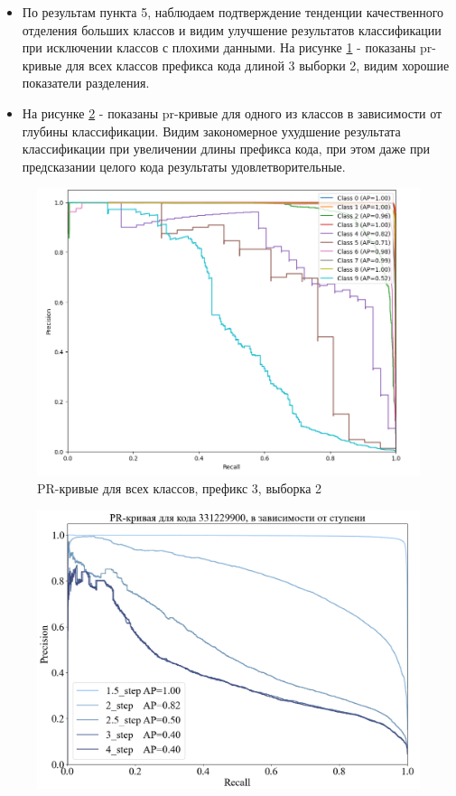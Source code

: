 \documentclass{article}
\begin{document}
\begin{itemize}
    \item По результам пункта 5, наблюдаем подтверждение тенденции качественного отделения больших классов и видим улучшение результатов классификации при исключении классов с плохими данными. На рисунке \ref{fig:pr2} - показаны pr-кривые для всех классов префикса кода длиной 3 выборки 2, видим хорошие показатели разделения. 
    \item На рисунке \ref{fig:pr3} - показаны pr-кривые для одного из классов в зависимости от глубины классификации. Видим закономерное ухудшение результата классификации при увеличении длины префикса кода, при этом даже при предсказании целого кода результаты удовлетворительные.  
\end{itemize} 


\begin{figure}[!ht]
        \centering
        \includegraphics[width=\linewidth]{pr_good.png}
        \caption{PR-кривые для всех классов, префикс 3, выборка 2}
        \label{fig:pr2}
\end{figure}
\begin{figure}[!ht]
        \centering
        \includegraphics[width=\linewidth]{pr_curve_1.png}
        \label{fig:pr3}
\end{figure}
\end{document}
